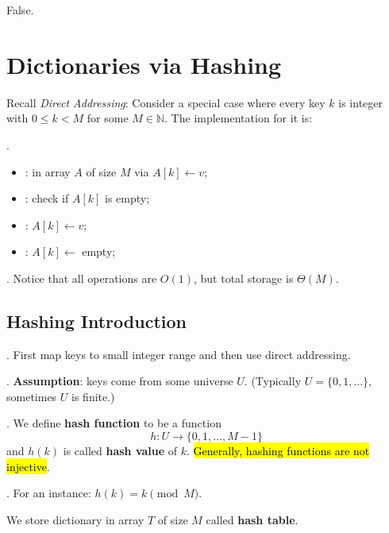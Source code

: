 \documentclass{article}
\begin{document}
\begin{solution}
    False. 
\end{solution}

\newpage 

\section{Dictionaries via Hashing} 

Recall \textit{Direct Addressing}: Consider a special case where every key $k$ is integer with $0 \leq k < M$ for some $M \in \mathbb{N}$. The implementation for it is: 

\begin{algo}[].
    \begin{itemize}
        \item {}: in array $A$ of size $M$ via $A[k] \leftarrow v$;  
        \item {}: check if $A[k]$ is empty; 
        \item {}: $A[k] \leftarrow v$; 
        \item {}: $A[k] \leftarrow$ empty; 
    \end{itemize}
\end{algo}

\begin{discovery}[].
    Notice that all operations are $O(1)$, but total storage is $\Theta(M)$. 
\end{discovery}

\subsection{Hashing Introduction} 

\begin{deff}.
    First map keys to small integer range and then use direct addressing. 
\end{deff}

\begin{comm}[].
    \textbf{Assumption}: keys come from some universe $U$. (Typically $U = \{0, 1, \ldots\}$, sometimes $U$ is finite.) 
\end{comm}

\begin{deff}.
    We define \textbf{hash function} to be a function 
    \[ h : U \rightarrow \{0, 1, \ldots, M -1\} \] 
    and $h(k)$ is called \textbf{hash value} of $k$. \hl{Generally, hashing functions are not injective}. 

    \begin{examplee}[].
        For an instance: $h(k) = k \pmod{M}$. 
    \end{examplee}

    We store dictionary in array $T$ of size $M$ called \textbf{hash table}. 
\end{deff}
\end{document}
